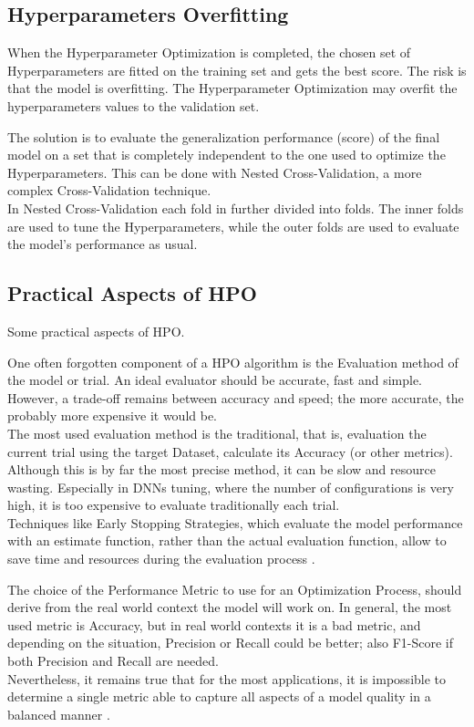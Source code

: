 \subsection{Hyperparameters Overfitting}

When the Hyperparameter Optimization is completed, the chosen set of Hyperparameters are fitted on the training set and gets the best score.
The risk is that the model is overfitting. The Hyperparameter Optimization may overfit the hyperparameters values to the validation set.

The solution is to evaluate the generalization performance (score) of the final model on a set that is completely independent to the one used to optimize the Hyperparameters.
This can be done with Nested Cross-Validation, a more complex Cross-Validation technique.
\\[0.3cm]In Nested Cross-Validation each fold in further divided into folds. The inner folds are used to tune the Hyperparameters, while the outer folds are used to evaluate the model’s performance as usual.

\subsection{Practical Aspects of HPO}

Some practical aspects of HPO.

One often forgotten component of a HPO algorithm is the Evaluation method of the model or trial.
An ideal evaluator should be accurate, fast and simple. However, a trade-off remains between accuracy and speed; the more accurate, the probably more expensive it would be.
\\[0.3cm]The most used evaluation method is the traditional, that is, evaluation the current trial using the target Dataset, calculate its Accuracy (or other metrics).
Although this is by far the most precise method, it can be slow and resource wasting. Especially in DNNs tuning, where the number of configurations is very high, it is too expensive to evaluate traditionally each trial.
\\[0.3cm]Techniques like Early Stopping Strategies, which evaluate the model performance with an estimate function, rather than the actual evaluation function, allow to save time and resources during the evaluation process \cite{Tesi-1.8}.

The choice of the Performance Metric to use for an Optimization Process, should derive from the real world context the model will work on.
In general, the most used metric is Accuracy, but in real world contexts it is a bad metric, and depending on the situation, Precision or Recall could be better; also F1-Score if both Precision and Recall are needed.
\\[0.3cm]Nevertheless, it remains true that for the most applications, it is impossible to determine a single metric able to capture all aspects of a model quality in a balanced manner \cite{Tesi-1.8}.

